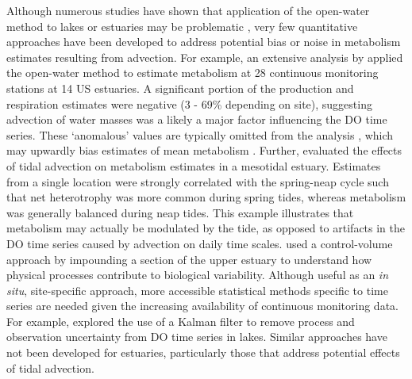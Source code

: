 \documentclass[letterpaper,12pt,oneside]{article}\usepackage[]{graphicx}\usepackage[]{color}
\begin{document}
Although numerous studies have shown that application of the open-water method to lakes or estuaries may be problematic \citep{Ziegler98,Caffrey03,Coloso11,Batt12,Nidzieko14}, very few quantitative approaches have been developed to address potential bias or noise in metabolism estimates resulting from advection.  For example, an extensive analysis by \citet{Caffrey03} applied the open-water method to estimate metabolism at 28 continuous monitoring stations at 14 US estuaries.  A significant portion of the production and respiration estimates were negative (3 - 69\% depending on site), suggesting advection of water masses was a likely a major factor influencing the \ac{DO} time series.  These `anomalous' values are typically omitted from the analysis \citep{Caffrey03,Collins13}, which may upwardly bias estimates of mean metabolism \citep{Caffrey14}.  Further, \citet{Nidzieko14} evaluated the effects of tidal advection on metabolism estimates in a mesotidal estuary.  Estimates from a single location were strongly correlated with the spring-neap cycle such that net heterotrophy was more common during spring tides, whereas metabolism was generally balanced during neap tides.  This example illustrates that metabolism may actually be modulated by the tide, as opposed to artifacts in the \ac{DO} time series caused by advection on daily time scales.  \citet{Nidzieko14} used a control-volume approach by impounding a section of the upper estuary to understand how physical processes contribute to biological variability.  Although useful as an \textit{in situ}, site-specific approach, more accessible statistical methods specific to time series are needed given the increasing availability of continuous monitoring data. For example, \citet{Batt12} explored the use of a Kalman filter \citep{Harvey89} to remove process and observation uncertainty from \ac{DO} time series in lakes.  Similar approaches have not been developed for estuaries, particularly those that address potential effects of tidal advection.
\end{document}
